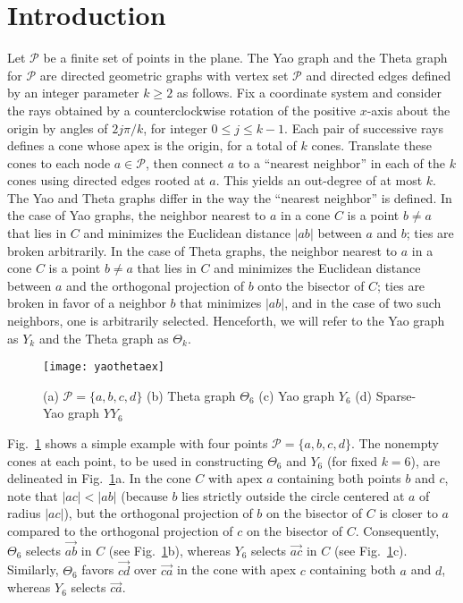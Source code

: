 \documentclass[11pt]{article}
\newcommand\cone{{C}}
\newcommand\Pt{\mathcal P}
\newcommand{\arr}[1]{\overrightarrow{#1}}
\begin{document}
\section{Introduction}
Let $\Pt$ be a finite set of points in the plane. The Yao graph and the Theta graph for $\Pt$ are directed geometric graphs with vertex set $\Pt$ and directed edges defined by an integer parameter $k \ge 2$ as follows. Fix a coordinate system and consider the rays obtained by a counterclockwise rotation of the positive $x$-axis about the origin by angles of $2j\pi/k$, for integer $0 \le j \le k-1$. Each pair of successive rays defines a cone whose apex is the origin, for a total of $k$ cones. Translate these cones to each node $a \in \Pt$, then connect $a$ to a ``nearest neighbor'' in each of the $k$ cones using directed edges rooted at $a$. This yields an out-degree of at most $k$. The Yao and Theta graphs differ in the way the ``nearest neighbor'' is defined.
In the case of Yao graphs, the neighbor nearest to $a$ in a cone $\cone$ is a point $b\neq a$ that lies in $C$ and minimizes the Euclidean distance $|ab|$ between $a$ and $b$; ties are broken arbitrarily.
In the case of Theta graphs, the neighbor nearest to $a$ in a cone $\cone$ is a point $b \neq a$ that lies in $C$ and minimizes the Euclidean distance between $a$ and the orthogonal projection of $b$ onto the bisector of $C$; ties are broken in favor of a neighbor $b$ that minimizes $|ab|$, and in the case of two such neighbors, one is arbitrarily selected.
Henceforth, we will refer to the Yao graph as $Y_k$ and the Theta graph as $\Theta_k$.
\begin{figure}[htpb]
\centering
\texttt{[image: yaothetaex]}
\caption{(a) $\Pt = \{a,b,c,d\}$ (b) Theta graph $\Theta_6$ (c) Yao graph $Y_6$ (d) Sparse-Yao graph $YY_6$}
\label{fig:yaothetaex}
\end{figure}
Fig.~\ref{fig:yaothetaex} shows a simple example with four points $\Pt = \{a,b,c,d\}$.
The nonempty cones at each point, to be used in constructing $\Theta_6$ and $Y_6$ (for fixed $k = 6$),
are delineated in Fig.~\ref{fig:yaothetaex}a. In the cone $\cone$ with apex $a$ containing both points
$b$ and $c$, note that $|ac| < |ab|$ (because $b$ lies strictly outside the circle centered at
$a$ of radius $|ac|$), but the orthogonal projection of $b$ on the bisector of $\cone$ is closer to $a$
compared to the orthogonal projection of $c$ on the bisector of $C$. Consequently, $\Theta_6$ selects
$\arr{ab}$ in $\cone$ (see Fig.~\ref{fig:yaothetaex}b), whereas $Y_6$ selects $\arr{ac}$ in $\cone$ (see Fig.~\ref{fig:yaothetaex}c).
Similarly, $\Theta_6$ favors $\arr{cd}$ over $\arr{ca}$ in the cone with apex $c$ containing both $a$ and $d$,
whereas $Y_6$ selects $\arr{ca}$.
\end{document}

